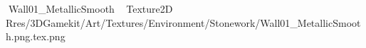    Wall01_MetallicSmooth             	   Texture2D
   R   res/3DGamekit/Art/Textures/Environment/Stonework/Wall01_MetallicSmooth.png.tex.png